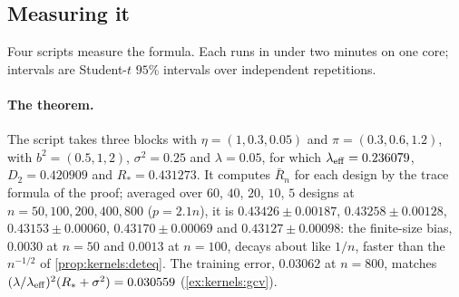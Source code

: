 \begin{refsection}
\section{Measuring it}\label{sec:kernels:measure}

Four scripts measure the formula. Each runs in under two minutes on one core; intervals are Student-$t$ $95\%$ intervals over independent repetitions.

\paragraph{The theorem.} The script  takes three blocks with $\eta=(1,0.3,0.05)$ and $\pi=(0.3,0.6,1.2)$, with $b^2=(0.5,1,2)$, $\sigma^2=0.25$ and $\lambda=0.05$, for which $\lambda_{\mathrm{eff}}=0.236079$, $D_2=0.420909$ and $R_*=0.431273$. It computes $\bar R_n$ for each design by the trace formula of the proof; averaged over $60$, $40$, $20$, $10$, $5$ designs at $n=50,100,200,400,800$ ($p=2.1n$), it is $0.43426\pm0.00187$, $0.43258\pm0.00128$, $0.43153\pm0.00060$, $0.43170\pm0.00069$ and $0.43127\pm0.00098$: the finite-size bias, $0.0030$ at $n=50$ and $0.0013$ at $n=100$, decays about like $1/n$, faster than the $n^{-1/2}$ of \cref{prop:kernels:deteq}. The training error, $0.03062$ at $n=800$, matches $(\lambda/\lambda_{\mathrm{eff}})^2(R_*+\sigma^2)=0.030559$ (\cref{ex:kernels:gcv}).


\end{refsection}
